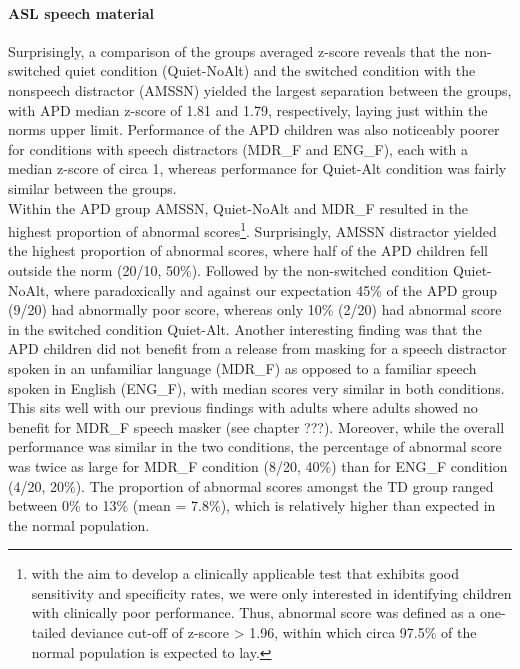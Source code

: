 \documentclass[a4paper, twoside]{templates/ociamthesis}
\begin{document}
\hypertarget{asl-speech-material}{%
\paragraph*{ASL speech material}\label{asl-speech-material}}

\hfill\break
Surprisingly, a comparison of the groups averaged z-score reveals that the non-switched quiet condition (Quiet-NoAlt) and the switched condition with the nonspeech distractor (AMSSN) yielded the largest separation between the groups, with APD median z-score of 1.81 and 1.79, respectively, laying just within the norms upper limit. Performance of the APD children was also noticeably poorer for conditions with speech distractors (MDR\_F and ENG\_F), each with a median z-score of circa 1, whereas performance for Quiet-Alt condition was fairly similar between the groups.\\

Within the APD group AMSSN, Quiet-NoAlt and MDR\_F resulted in the highest proportion of abnormal scores\footnote{with the aim to develop a clinically applicable test that exhibits good sensitivity and specificity rates, we were only interested in identifying children with clinically poor performance. Thus, abnormal score was defined as a one-tailed deviance cut-off of z-score \textgreater{} 1.96, within which circa 97.5\% of the normal population is expected to lay.}. Surprisingly, AMSSN distractor yielded the highest proportion of abnormal scores, where half of the APD children fell outside the norm (20/10, 50\%). Followed by the non-switched condition Quiet-NoAlt, where paradoxically and against our expectation 45\% of the APD group (9/20) had abnormally poor score, whereas only 10\% (2/20) had abnormal score in the switched condition Quiet-Alt. Another interesting finding was that the APD children did not benefit from a release from masking for a speech distractor spoken in an unfamiliar language (MDR\_F) as opposed to a familiar speech spoken in English (ENG\_F), with median scores very similar in both conditions. This sits well with our previous findings with adults where adults showed no benefit for MDR\_F speech masker (see chapter ???). Moreover, while the overall performance was similar in the two conditions, the percentage of abnormal score was twice as large for MDR\_F condition (8/20, 40\%) than for ENG\_F condition (4/20, 20\%). The proportion of abnormal scores amongst the TD group ranged between 0\% to 13\% (mean = 7.8\%), which is relatively higher than expected in the normal population.\\
\end{document}
